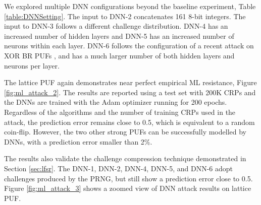 We explored multiple DNN configurations beyond the baseline experiment, Table \ref{table:DNNSetting}. The input to DNN-2 concatenates 161 8-bit integers. The input to DNN-3 follows a different challenge distribution. DNN-4 has an increased number of hidden layers and DNN-5 has an increased number of neurons within each layer. DNN-6 follows the configuration of a recent attack on XOR BR PUFs \cite{dnn_xor_br_puf}, and has a much larger number of both hidden layers and neurons per layer.


The lattice PUF again demonstrates near perfect empirical ML resistance, Figure \ref{fig:ml_attack_2}. The results are reported using a test set with 200K CRPs and the DNNs are trained with the Adam optimizer running for 200 epochs. Regardless of the algorithms and the number of training CRPs used in the attack, the prediction error remains close to 0.5, which is equivalent to a random coin-flip. However, the two other strong PUFs can be successfully modelled by DNNs, with a prediction error smaller than 2\%.


The results also validate the challenge compression technique demonstrated in Section \ref{sec:lfsr}. The DNN-1, DNN-2, DNN-4, DNN-5, and DNN-6 adopt challenges produced by the PRNG, but still show a prediction error close to 0.5. Figure \ref{fig:ml_attack_3} shows a zoomed view of DNN attack results on lattice PUF.


